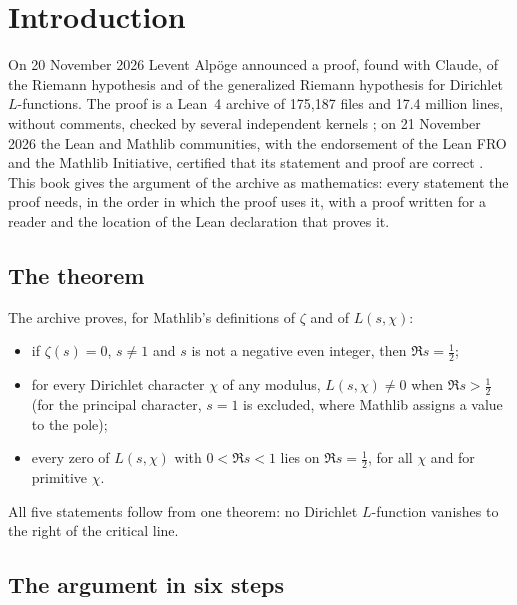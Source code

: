 \chapter*{Introduction}\label{ch:intro}

On 20 November 2026 Levent Alpöge announced a proof, found with Claude, of the Riemann hypothesis and of the generalized Riemann hypothesis for Dirichlet $L$-functions. The proof is a Lean~4 archive of 175{,}187 files and 17.4 million lines, without comments, checked by several independent kernels \cite{sutherland-2026}; on 21 November 2026 the Lean and Mathlib communities, with the endorsement of the Lean FRO and the Mathlib Initiative, certified that its statement and proof are correct \cite{leanfro-2026}. This book gives the argument of the archive as mathematics: every statement the proof needs, in the order in which the proof uses it, with a proof written for a reader and the location of the Lean declaration that proves it.

\section*{The theorem}

The archive proves, for Mathlib's definitions of $\zeta$ and of $L(s,\chi)$:
\begin{itemize}
\item if $\zeta(s)=0$, $s\neq1$ and $s$ is not a negative even integer, then $\Re s=\tfrac12$;
\item for every Dirichlet character $\chi$ of any modulus, $L(s,\chi)\ne0$ when $\Re s>\tfrac12$ (for the principal character, $s=1$ is excluded, where Mathlib assigns a value to the pole);
\item every zero of $L(s,\chi)$ with $0<\Re s<1$ lies on $\Re s=\tfrac12$, for all $\chi$ and for primitive $\chi$.
\end{itemize}
All five statements follow from one theorem: no Dirichlet $L$-function vanishes to the right of the critical line.

\section*{The argument in six steps}

